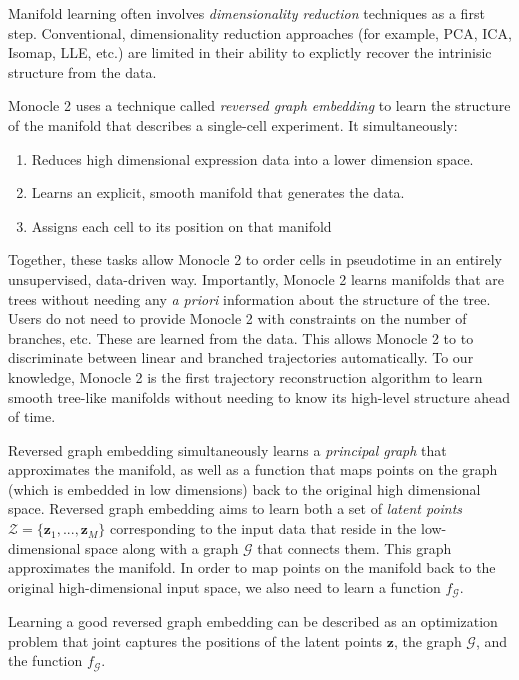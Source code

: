 \documentclass[10pt,oneside]{article}\usepackage[]{graphicx}\usepackage[]{color}
\begin{document}
Manifold learning often involves \emph{dimensionality reduction} techniques as a 
first step. Conventional, dimensionality reduction approaches (for 
example, PCA, ICA, Isomap, LLE, etc.) are limited in their ability to explictly 
recover the intrinisic structure from the data. 

Monocle 2 uses a technique called \emph{reversed graph embedding}\cite{Mao2016-ru, Qiu2017-nx} to learn the 
structure of the manifold that describes a single-cell experiment. It simultaneously: 

\begin{enumerate}
\item Reduces high dimensional expression data into a lower dimension space.
\item Learns an explicit, smooth manifold that generates the data.
\item Assigns each cell to its position on that manifold 
\end{enumerate}

Together, these tasks allow Monocle 2 to order cells in pseudotime in an entirely
unsupervised, data-driven way. Importantly, Monocle 2 learns manifolds that are 
trees without needing any \emph{a priori} information about the structure of the
tree. Users do not need to provide Monocle 2 with constraints on the number of branches, etc. 
These are learned from the data. This allows Monocle 2 to to discriminate between
linear and branched trajectories automatically. To our knowledge, Monocle 2 is the first 
trajectory reconstruction algorithm to learn smooth tree-like manifolds without
needing to know its high-level structure ahead of time.

Reversed graph embedding simultaneously learns a \emph{principal graph} that
approximates the manifold, as well as a function that maps points on the graph 
(which is embedded in low dimensions) back to the original high dimensional space.
Reversed graph embedding aims to learn both a set of \emph{latent points} 
$\mathcal{Z} = \{\mathbf{z}_1, ..., \mathbf{z}_M\}$ corresponding to the input data
that reside in the low-dimensional space along with a graph $\mathcal{G}$ that
connects them. This graph approximates the manifold. In order to map points on 
the manifold back to the original high-dimensional input space, we also need to 
learn a function $f_{\mathcal{G}}$.  

Learning a good reversed graph embedding can be described as an optimization problem that 
joint captures the positions of the latent points $\mathbf{z}$, the graph $\mathcal{G}$, and the function
$f_\mathcal{G}$.
\end{document}
